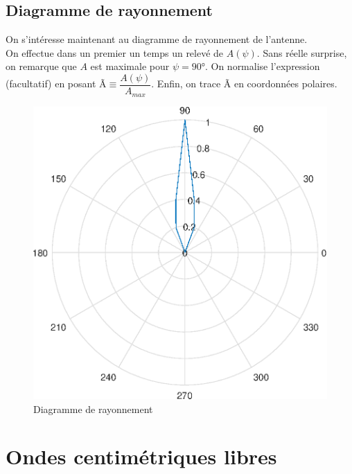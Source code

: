 \documentclass[12pt,a4paper]{article}
\begin{document}
	\subsection{Diagramme de rayonnement}
	On s'intéresse maintenant au diagramme de rayonnement de l'antenne.\\
	On effectue dans un premier un temps un relevé de $A(\psi)$. Sans réelle surprise, on remarque que $A$ est maximale pour $\psi=90$°. On normalise l'expression (facultatif) en posant \~{A}$\equiv\dfrac{A(\psi)}{A_{max}}$. Enfin, on trace \~{A} en coordonnées polaires.\\
\begin{figure}[h]
	\centering
	\caption[Diagramme de rayonnement]{Diagramme de rayonnement}
	\label{fig:rayonnement}
	\includegraphics[scale=0.6]{matlab/Rayonnement}
\end{figure}

	
	\section{Ondes centimétriques libres}
\end{document}
